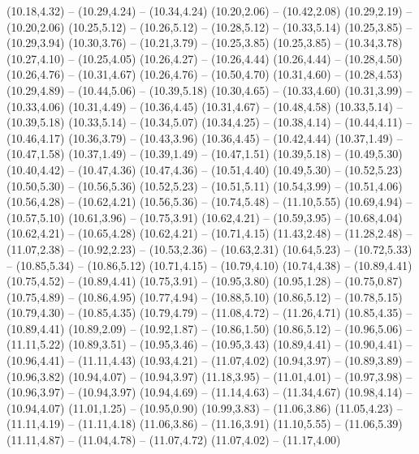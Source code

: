 {  (10.18,4.32) -- (10.29,4.24) -- (10.34,4.24)
  (10.20,2.06) -- (10.42,2.08)
  (10.29,2.19) -- (10.20,2.06)
  (10.25,5.12) -- (10.26,5.12) -- (10.28,5.12) -- (10.33,5.14)
  (10.25,3.85) -- (10.29,3.94)
  (10.30,3.76) -- (10.21,3.79) -- (10.25,3.85)
  (10.25,3.85) -- (10.34,3.78)
  (10.27,4.10) -- (10.25,4.05)
  (10.26,4.27) -- (10.26,4.44)
  (10.26,4.44) -- (10.28,4.50)
  (10.26,4.76) -- (10.31,4.67)
  (10.26,4.76) -- (10.50,4.70)
  (10.31,4.60) -- (10.28,4.53)
  (10.29,4.89) -- (10.44,5.06) -- (10.39,5.18)
  (10.30,4.65) -- (10.33,4.60)
  (10.31,3.99) -- (10.33,4.06)
  (10.31,4.49) -- (10.36,4.45)
  (10.31,4.67) -- (10.48,4.58)
  (10.33,5.14) -- (10.39,5.18)
  (10.33,5.14) -- (10.34,5.07)
  (10.34,4.25) -- (10.38,4.14) -- (10.44,4.11) -- (10.46,4.17)
  (10.36,3.79) -- (10.43,3.96)
  (10.36,4.45) -- (10.42,4.44)
  (10.37,1.49) -- (10.47,1.58)
  (10.37,1.49) -- (10.39,1.49) -- (10.47,1.51)
  (10.39,5.18) -- (10.49,5.30)
  (10.40,4.42) -- (10.47,4.36)
  (10.47,4.36) -- (10.51,4.40)
  (10.49,5.30) -- (10.52,5.23)
  (10.50,5.30) -- (10.56,5.36)
  (10.52,5.23) -- (10.51,5.11)
  (10.54,3.99) -- (10.51,4.06)
  (10.56,4.28) -- (10.62,4.21)
  (10.56,5.36) -- (10.74,5.48) -- (11.10,5.55)
  (10.69,4.94) -- (10.57,5.10)
  (10.61,3.96) -- (10.75,3.91)
  (10.62,4.21) -- (10.59,3.95) -- (10.68,4.04)
  (10.62,4.21) -- (10.65,4.28)
  (10.62,4.21) -- (10.71,4.15)
  (11.43,2.48) -- (11.28,2.48) -- (11.07,2.38) -- (10.92,2.23) -- (10.53,2.36) -- (10.63,2.31)
  (10.64,5.23) -- (10.72,5.33) -- (10.85,5.34) -- (10.86,5.12)
  (10.71,4.15) -- (10.79,4.10)
  (10.74,4.38) -- (10.89,4.41)
  (10.75,4.52) -- (10.89,4.41)
  (10.75,3.91) -- (10.95,3.80)
  (10.95,1.28) -- (10.75,0.87)
  (10.75,4.89) -- (10.86,4.95)
  (10.77,4.94) -- (10.88,5.10)
  (10.86,5.12) -- (10.78,5.15)
  (10.79,4.30) -- (10.85,4.35)
  (10.79,4.79) -- (11.08,4.72) -- (11.26,4.71)
  (10.85,4.35) -- (10.89,4.41)
  (10.89,2.09) -- (10.92,1.87) -- (10.86,1.50)
  (10.86,5.12) -- (10.96,5.06) -- (11.11,5.22)
  (10.89,3.51) -- (10.95,3.46) -- (10.95,3.43)
  (10.89,4.41) -- (10.90,4.41) -- (10.96,4.41) -- (11.11,4.43)
  (10.93,4.21) -- (11.07,4.02)
  (10.94,3.97) -- (10.89,3.89) -- (10.96,3.82)
  (10.94,4.07) -- (10.94,3.97)
  (11.18,3.95) -- (11.01,4.01) -- (10.97,3.98) -- (10.96,3.97) -- (10.94,3.97)
  (10.94,4.69) -- (11.14,4.63) -- (11.34,4.67)
  (10.98,4.14) -- (10.94,4.07)
  (11.01,1.25) -- (10.95,0.90)
  (10.99,3.83) -- (11.06,3.86)
  (11.05,4.23) -- (11.11,4.19) -- (11.11,4.18)
  (11.06,3.86) -- (11.16,3.91)
  (11.10,5.55) -- (11.06,5.39)
  (11.11,4.87) -- (11.04,4.78) -- (11.07,4.72)
  (11.07,4.02) -- (11.17,4.00)
}
